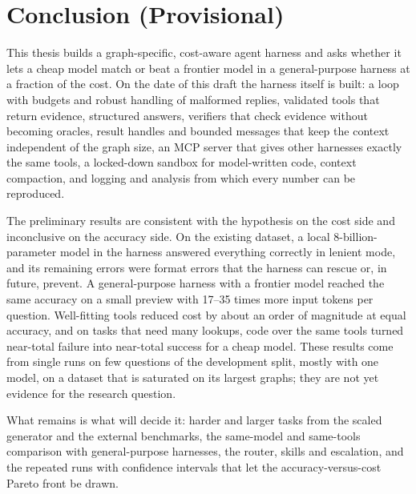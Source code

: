 \chapter{Conclusion (Provisional)}
\label{ch:conclusion}


This thesis builds a graph-specific, cost-aware agent harness and asks whether it lets a cheap model match or beat a
frontier model in a general-purpose harness at a fraction of the cost. On the date of this draft the harness itself is
built: a loop with budgets and robust handling of malformed replies, validated tools that return evidence, structured
answers, verifiers that check evidence without becoming oracles, result handles and bounded messages that keep the
context independent of the graph size, an MCP server that gives other harnesses exactly the same tools, a locked-down
sandbox for model-written code, context compaction, and logging and analysis from which every number can be
reproduced.

The preliminary results are consistent with the hypothesis on the cost side and inconclusive on the accuracy side.
On the existing dataset, a local 8-billion-parameter model in the harness answered everything correctly in lenient
mode, and its remaining errors were format errors that the harness can rescue or, in future, prevent. A
general-purpose harness with a frontier model reached the same accuracy on a small preview with 17--35 times more input
tokens per question. Well-fitting tools reduced cost by about an order of magnitude at equal accuracy, and on tasks
that need many lookups, code over the same tools turned near-total failure into near-total success for a cheap model.
These results come from single runs on few questions of the development split, mostly with one model, on a dataset that
is saturated on its largest graphs; they are not yet evidence for the research question.

What remains is what will decide it: harder and larger tasks from the scaled generator and the external benchmarks,
the same-model and same-tools comparison with general-purpose harnesses, the router, skills and escalation, and the
repeated runs with confidence intervals that let the accuracy-versus-cost Pareto front be drawn.

